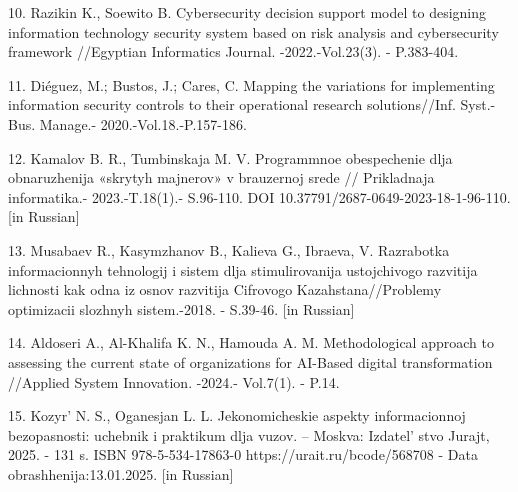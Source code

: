 \begin{references}
10. Razikin K., Soewito B. Cybersecurity decision support model to
designing information technology security system based on risk analysis
and cybersecurity framework //Egyptian Informatics Journal.
-2022.-Vol.23(3). - P.383-404.
\href{https://doi.org/10.1016/j.eij.2022.03.001}{}

11. Diéguez, M.; Bustos, J.; Cares, C. Mapping the variations for
implementing information security controls to their operational research
solutions//Inf. Syst.-Bus. Manage.- 2020.-Vol.18.-P.157-186.
~\href{https://doi.org/10.1007/s10257-020-00470-8}{}

12. Kamalov B. R., Tumbinskaja M. V. Programmnoe obespechenie dlja
obnaruzhenija «skrytyh majnerov» v brauzernoj srede // Prikladnaja
informatika.- 2023.-T.18(1).- S.96-110. DOI
10.37791/2687-0649-2023-18-1-96-110. {[}in Russian{]}

13. Musabaev R., Kasymzhanov B., Kalieva G., Ibraeva, V. Razrabotka
informacionnyh tehnologij i sistem dlja stimulirovanija ustojchivogo
razvitija lichnosti kak odna iz osnov razvitija Cifrovogo
Kazahstana//Problemy optimizacii slozhnyh sistem.-2018. - S.39-46.
{[}in Russian{]}

14. Aldoseri A., Al-Khalifa K. N., Hamouda A. M. Methodological approach
to assessing the current state of organizations for AI-Based digital
transformation //Applied System Innovation. -2024.- Vol.7(1). - P.14.
\href{https://doi.org/10.3390/asi7010014}{}

15. Kozyr'{} N. S., Oganesjan L. L. Jekonomicheskie
aspekty informacionnoj bezopasnosti: uchebnik i praktikum dlja vuzov. --
Moskva: Izdatel' stvo Jurajt, 2025. - 131 s. ISBN
978-5-534-17863-0 https://urait.ru/bcode/568708 - Data
obrashhenija:13.01.2025. {[}in Russian{]}
\end{references}

